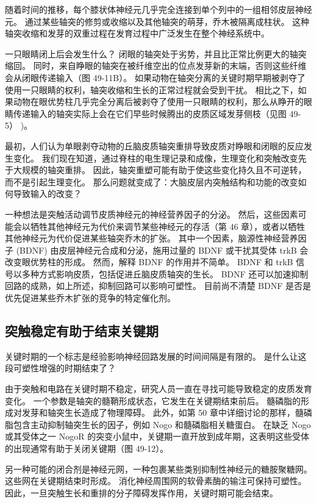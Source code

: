 随着时间的推移，每个膝状体神经元几乎完全连接到单个列中的一组相邻皮层神经元。 通过某些轴突的修剪或收缩以及其他轴突的萌芽，乔木被隔离成柱状。 这种轴突收缩和发芽的双重过程在发育过程中广泛发生在整个神经系统中。

一只眼睛闭上后会发生什么？ 闭眼的轴突处于劣势，并且比正常比例更大的轴突缩回。 同时，来自睁眼的轴突在被纤维空出的位点发芽新的末端，否则这些纤维会从闭眼传递输入（图 49-11B）。 如果动物在轴突分离的关键时期早期被剥夺了使用一只眼睛的权利，轴突收缩和生长的正常过程就会受到干扰。 相比之下，如果动物在眼优势柱几乎完全分离后被剥夺了使用一只眼睛的权利，那么从睁开的眼睛传递输入的轴突实际上会在它们早些时候腾出的皮质区域发芽侧枝（见图 49-5） )。

最初，人们认为单眼剥夺动物的丘脑皮质轴突重排导致皮质对睁眼和闭眼的反应发生变化。 我们现在知道，通过脊柱的电生理记录和成像，生理变化和突触改变先于大规模的轴突重排。 因此，轴突重塑可能有助于使这些变化持久且不可逆转，而不是引起生理变化。 那么问题就变成了：大脑皮层内突触结构和功能的改变如何导致输入的改变？

一种想法是突触活动调节皮质神经元的神经营养因子的分泌。 然后，这些因素可能会以牺牲其他神经元为代价来调节某些神经元的存活（第 46 章），或者以牺牲其他神经元为代价促进某些轴突乔木的扩张。 其中一个因素，脑源性神经营养因子 (BDNF) 由皮层神经元合成和分泌，施用过量的 BDNF 或干扰其受体 trkB 会改变眼优势柱的形成。 然而，解释 BDNF 的作用并不简单。 BDNF 和 trkB 信号以多种方式影响皮质，包括促进丘脑皮质轴突的生长。 BDNF 还可以加速抑制回路的成熟，如上所述，抑制回路可以影响可塑性。 目前尚不清楚 BDNF 是否是优先促进某些乔木扩张的竞争的特定催化剂。

\subsection{突触稳定有助于结束关键期}

关键时期的一个标志是经验影响神经回路发展的时间间隔是有限的。 是什么让这段可塑性增强的时期结束了？

由于突触和电路在关键时期不稳定，研究人员一直在寻找可能导致稳定的皮质发育变化。 一个参数是轴突的髓鞘形成状态，它发生在关键期结束前后。 髓磷脂的形成对发芽和轴突生长造成了物理障碍。 此外，如第 50 章中详细讨论的那样，髓磷脂包含主动抑制轴突生长的因子，例如 Nogo 和髓磷脂相关糖蛋白。 在缺乏 Nogo 或其受体之一 NogoR 的突变小鼠中，关键期一直开放到成年期，这表明这些受体的出现通常有助于关闭关键期（图 49-12）。

另一种可能的闭合剂是神经元网，一种包裹某些类别抑制性神经元的糖胺聚糖网。 这些网在关键期结束时形成。 消化神经周围网的软骨素酶的输注可保持可塑性。 因此，一旦突触生长和重排的分子障碍发挥作用，关键时期可能会结束。

